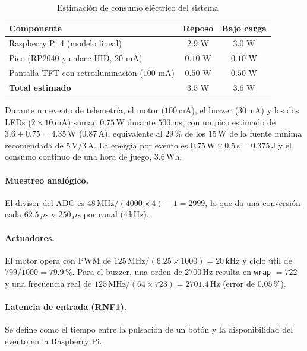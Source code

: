 \begin{table}[H]
	\centering
	\caption{Estimación de consumo eléctrico del sistema}
	\label{tab:energia}
	\footnotesize
	\begin{tabular}{|l|c|c|}
		\hline
		\textbf{Componente} & \textbf{Reposo} & \textbf{Bajo carga} \\
		\hline
		Raspberry Pi 4 (modelo lineal) & $2.9\text{ W}$ & $3.0\text{ W}$ \\
		\hline
		Pico (RP2040 y enlace HID, $20\text{ mA}$) & $0.10\text{ W}$ & $0.10\text{ W}$ \\
		\hline
		Pantalla TFT con retroiluminación ($100\text{ mA}$) & $0.50\text{ W}$ & $0.50\text{ W}$ \\
		\hline
		\textbf{Total estimado} & \textbf{$3.5\text{ W}$} & \textbf{$3.6\text{ W}$} \\
		\hline
	\end{tabular}
\end{table}

Durante un evento de telemetría, el motor ($100\,\mathrm{mA}$), el buzzer ($30\,\mathrm{mA}$) y los dos LEDs ($2\times 10\,\mathrm{mA}$) suman $0.75\,\mathrm{W}$ durante $500\,\mathrm{ms}$, con un pico estimado de $3.6 + 0.75 = 4.35\,\mathrm{W}$ ($0.87\,\mathrm{A}$), equivalente al $29\,\%$ de los $15\,\mathrm{W}$ de la fuente mínima recomendada de $5\,\mathrm{V}/3\,\mathrm{A}$. La energía por evento es $0.75\,\mathrm{W}\times 0.5\,\mathrm{s} = 0.375\,\mathrm{J}$ y el consumo continuo de una hora de juego, $3.6\,\mathrm{Wh}$.



\paragraph{Muestreo analógico.}
El divisor del ADC es $48\,\mathrm{MHz}/(4000\times 4) - 1 = 2999$, lo que da una conversión cada $62.5\,\mu\mathrm{s}$ y $250\,\mu\mathrm{s}$ por canal ($4\,\mathrm{kHz}$).

\paragraph{Actuadores.}
El motor opera con PWM de $125\,\mathrm{MHz}/(6.25\times 1000) = 20\,\mathrm{kHz}$ y ciclo útil de $799/1000 = 79.9\,\%$. Para el buzzer, una orden de $2700\,\mathrm{Hz}$ resulta en \texttt{wrap} $=722$ y una frecuencia real de $125\,\mathrm{MHz}/(64\times 723) = 2701.4\,\mathrm{Hz}$ (error de $0.05\,\%$).

\paragraph{Latencia de entrada (RNF1).}
Se define como el tiempo entre la pulsación de un botón y la disponibilidad del evento en la Raspberry Pi.

